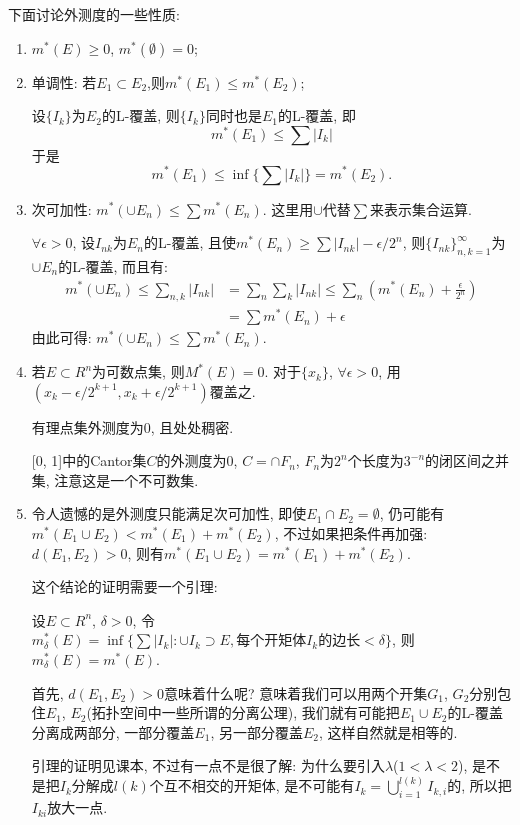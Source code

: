 \documentclass[12pt,a4paper,openany]{book}
\begin{document}
下面讨论外测度的一些性质:
\begin{enumerate}
\item $m^*(E) \ge 0$, $m^*(\emptyset) = 0$;

\item 单调性: 若$E_1 \subset E_2$,则$m^*(E_1) \le m^*(E_2)$;

设$\{I_k\}$为$E_2$的L-覆盖, 则$\{I_k\}$同时也是$E_1$的L-覆盖, 即
\[
m^*(E_1) \le \sum{|I_k|}
\]
于是
\[
m^*(E_1) \le \inf\{\sum{|I_k|}\} = m^*(E_2).
\]

\item 次可加性: $m^*(\cup{E_n}) \le \sum{m^*(E_n)}$. 这里用$\cup$代替$\sum$来表示集合运算.

$\forall \epsilon > 0$, 设$I_{nk}$为$E_n$的L-覆盖, 且使$m^*(E_n) \ge \sum{|I_{nk}|} - \epsilon/2^n$, 则$\{I_{nk}\}_{n,k=1}^{\infty}$为$\cup{E_n}$的L-覆盖, 而且有:
\[
\begin{aligned}
m^*(\cup{E_n}) \le \sum_{n,k}{|I_{nk}|} &= \sum_{n}{\sum_{k}{|I_{nk}|}} \le \sum_{n}{(m^*(E_n) + \frac{\epsilon}{2^n})}\\
&= \sum{m^*(E_n)} + \epsilon
\end{aligned}
\]
由此可得: $m^*(\cup{E_n}) \le \sum{m^*(E_n)}$.

\item 若$E \subset R^n$为可数点集, 则$M^*(E) = 0$. 对于$\{x_k\}$, $\forall \epsilon > 0$, 用$(x_k - \epsilon/2^{k+1}, x_k + \epsilon/2^{k+1})$覆盖之.

有理点集外测度为0, 且处处稠密. 

[0, 1]中的Cantor集$C$的外测度为0, $C = \cap{F_n}$, $F_n$为$2^n$个长度为$3^{-n}$的闭区间之并集, 注意这是一个不可数集.

\item 令人遗憾的是外测度只能满足次可加性, 即使$E_1 \cap E_2 = \emptyset$, 仍可能有$m^*(E_1 \cup E_2) < m^*(E_1) + m^*(E_2)$, 不过如果把条件再加强: $d(E_1, E_2) > 0$, 则有$m^*(E_1 \cup E_2) = m^*(E_1) + m^*(E_2)$.

这个结论的证明需要一个引理:

设$E \subset R^n$, $\delta > 0$, 令$m_{\delta}^*(E) = \inf\{\sum{|I_k|} : \cup{I_k} \supset E, \text{每个开矩体}I_k\text{的边长}<\delta \}$, 则$m_{\delta}^*(E) = m^*(E)$.

首先, $d(E_1, E_2) > 0$意味着什么呢? 意味着我们可以用两个开集$G_1$, $G_2$分别包住$E_1$, $E_2$(拓扑空间中一些所谓的分离公理), 我们就有可能把$E_1 \cup E_2$的L-覆盖分离成两部分, 一部分覆盖$E_1$, 另一部分覆盖$E_2$, 这样自然就是相等的.

引理的证明见课本, 不过有一点不是很了解: 为什么要引入$\lambda$($1 < \lambda < 2$), 是不是把$I_k$分解成$l(k)$个互不相交的开矩体, 是不可能有$I_k = \bigcup_{i=1}^{l(k)}{I_{k,i}}$的, 所以把$I_{ki}$放大一点.


\end{enumerate}
\end{document}
